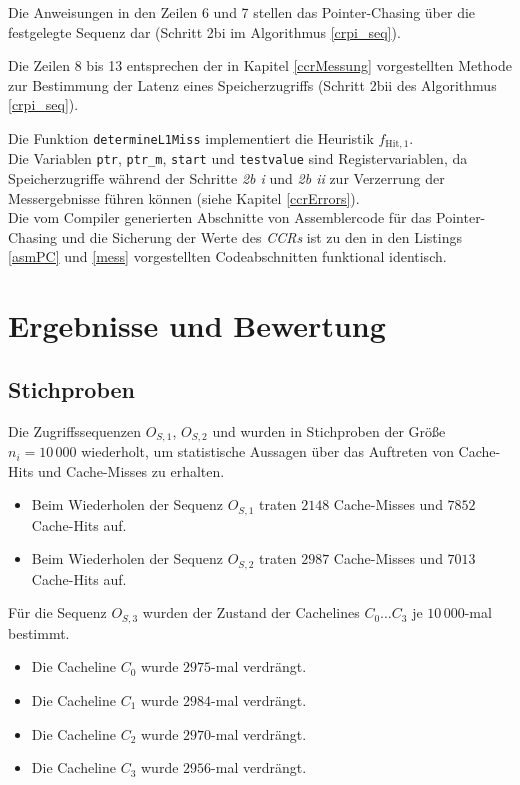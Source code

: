 \documentclass[]{scrbook}
\begin{document}
Die Anweisungen in den Zeilen 6 und 7 stellen das Pointer-Chasing über die festgelegte Sequenz dar (Schritt 2bi im Algorithmus \ref{crpi_seq}).

Die Zeilen 8 bis 13 entsprechen der in Kapitel \ref{ccrMessung} vorgestellten Methode zur Bestimmung der Latenz eines Speicherzugriffs (Schritt 2bii des Algorithmus \ref{crpi_seq}).

Die Funktion \texttt{determineL1Miss} implementiert die Heuristik $f_{\textrm{Hit},1}$. 
\\
Die Variablen \texttt{ptr}, \texttt{ptr\_m}, \texttt{start} und \texttt{testvalue} sind Registervariablen, da Speicherzugriffe während der Schritte \textit{2b i} und \textit{2b ii} zur Verzerrung der Messergebnisse führen können (siehe Kapitel \ref{ccrErrors}).  
\\
Die vom Compiler generierten Abschnitte von Assemblercode für das Pointer-Chasing und die Sicherung der Werte des \textsl{CCRs} ist zu den in den Listings \ref{asmPC} und \ref{mess} vorgestellten Codeabschnitten funktional identisch.



\section{Ergebnisse und Bewertung}

\subsection{Stichproben}

Die Zugriffssequenzen $O_{S,1}$, $O_{S,2}$ und wurden in Stichproben der Größe $n_i=10\,000$ wiederholt, um statistische Aussagen über das Auftreten von Cache-Hits und Cache-Misses zu erhalten. 

\begin{itemize}
	\item Beim Wiederholen der Sequenz $O_{S,1}$ traten $2148$ Cache-Misses und $7852$ Cache-Hits auf.
	\item Beim Wiederholen der Sequenz $O_{S,2}$ traten $2987$ Cache-Misses und $7013$ Cache-Hits auf.
\end{itemize}

Für die Sequenz $O_{S,3}$ wurden der Zustand der Cachelines $C_0 \dots C_3$ je $10\,000$-mal bestimmt.

\begin{itemize}
	\item Die Cacheline $C_0$ wurde $2975$-mal verdrängt.
	\item Die Cacheline $C_1$ wurde $2984$-mal verdrängt.
	\item Die Cacheline $C_2$ wurde $2970$-mal verdrängt.
	\item Die Cacheline $C_3$ wurde $2956$-mal verdrängt.
\end{itemize}
\end{document}
